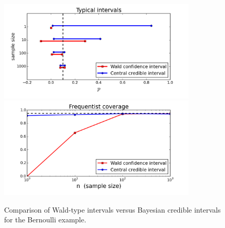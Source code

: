 \documentclass[12pt]{article}
\begin{document}
\begin{figure}
\begin{center}
\includegraphics[trim=0 0 0 0, clip, width=0.85\textwidth]{code/ex3-intervals.png}
\includegraphics[trim=0 0 0 0, clip, width=0.85\textwidth]{code/ex3-coverage.png}
\end{center}
\caption{Comparison of Wald-type intervals versus Bayesian credible intervals for the Bernoulli example.}
\label{figure:intervals}
\end{figure}
\end{document}

